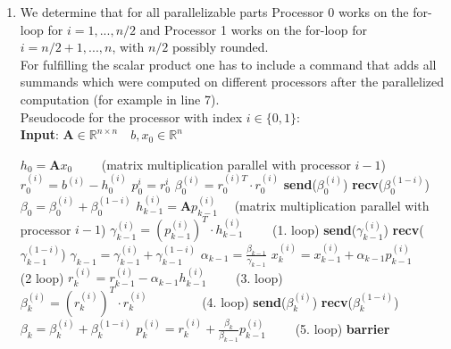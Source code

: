 \documentclass{article}
\begin{document}
\begin{enumerate}[label=(\alph*)]
\item
We determine that for all parallelizable parts Processor 0 works on the for-loop for $i = 1,...,n/2$ and Processor 1 works on the for-loop for $i = n/2+1,...,n$, with $n/2$ possibly rounded.
\\
For fulfilling the scalar product one has to include a command that adds all summands which were computed on different processors after the parallelized computation (for example in line 7).
\\
Pseudocode for the processor with index $i\in\{0,1\}$:
\\
   \textbf{Input}: $ \textbf{A} \in \mathbb{R}^{n\times n} \quad b, x_0\in \mathbb{R}^n$
    \begin{algorithmic}[1]
	\State $h_{0} = \textbf{A}x_{0}\qquad $ (matrix multiplication parallel with processor $i-1$)
	\State $r^{(i)}_0 = b^{(i)} - h_0^{(i)}$
	\State $p_0^{i} = r_0^{i}$
	\State $\beta_0^{(i)} = r^{(i)T}_0\cdot r^{(i)}_0$
	\State \textbf{send}($\beta_{0}^{(i)}$)
	\State \textbf{recv}($\beta_{0}^{(1-i)}$)
	\State $\beta_0=\beta_0^{(i)}+\beta_0^{(1-i)}$
	\State $h^{(i)}_{k-1} = \textbf{A}p^{(i)}_{k-1}\quad$ \small(matrix multiplication parallel with processor $i-1$)\normalsize
	\State $\gamma^{(i)}_{k-1} = (p^{(i)}_{k-1})^T\cdot h^{(i)}_{k-1}\qquad$ (1. loop)
	\State \textbf{send}($\gamma_{k-1}^{(i)}$)
	\State \textbf{recv}($\gamma_{k-1}^{(1-i)}$)
	\State $\gamma_{k-1} = \gamma_{k-1}^{(i)}+\gamma_{k-1}^{(1-i)}$
	\State $\alpha_{k-1} = \frac{\beta_{k-1}}{\gamma_{k-1}}$
	\State $x^{(i)}_k = x^{(i)}_{k-1} + \alpha_{k-1}p^{(i)}_{k-1}\qquad$ (2 loop)
	\State $r^{(i)}_k = r^{(i)}_{k-1} - \alpha_{k-1}h^{(i)}_{k-1}\qquad$ (3. loop)
	\State $\beta^{(i)}_k = (r^{(i)}_k)^T\cdot r^{(i)}_k\qquad \qquad $ (4. loop)
	\State \textbf{send}($\beta_k^{(i)}$)
	\State \textbf{recv}($\beta_k^{(1-i)}$)
	\State $\beta_k = \beta_k^{(i)}+\beta_k^{(1-i)}$
	\State $p^{(i)}_k = r^{(i)}_{k} + \frac{\beta_k}{\beta_{k-1}}p_{k-1}^{(i)}\qquad$ (5. loop)
	\State \textbf{barrier}
	\EndFor
    \end{algorithmic}


\end{enumerate}
\end{document}
